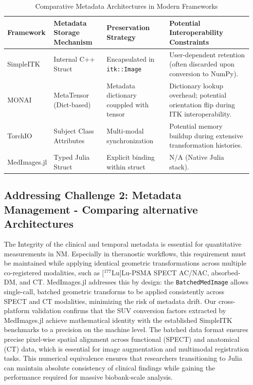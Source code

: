\documentclass[a4paper,10pt,preprint]{elsarticle}
\begin{document}
\begin{table}[H]
\centering
\caption{Comparative Metadata Architectures in Modern Frameworks}
\begin{tabular}{|p{2cm}|p{2.8cm}|p{2.8cm}|p{2.8cm}|}
\hline
\textbf{Framework} & \textbf{Metadata Storage Mechanism} & \textbf{Preservation Strategy} & \textbf{Potential Interoperability Constraints} \\
\hline
SimpleITK & Internal C++ Struct & Encapsulated in \texttt{itk::Image} & User-dependent retention (often discarded upon conversion to NumPy). \\
\hline
MONAI & MetaTensor (Dict-based) & Metadata dictionary couppled with tensor& Dictionary lookup overhead; potential orientation flip during ITK interoperability. \\
\hline
TorchIO & Subject Class Attributes & Multi-modal synchronization & Potential memory buildup during extensive transformation histories. \\
\hline
MedImages.jl & Typed Julia Struct & Explicit binding within struct & N/A (Native Julia stack). \\
\hline
\end{tabular}
\label{tab:metadata_comparison}
\end{table}


\subsection{Addressing Challenge 2: Metadata Management - Comparing alternative Architectures}
The Integrity of the clinical and temporal metadata is essential for quantitative measurements in NM. Especially in theranostic workflows, this requirement must be maintained while applying identical geometric transformations across multiple co-registered modalities, such as [$^{177}$Lu]Lu-PSMA SPECT AC/NAC, absorbed-DM, and CT.
MedImages.jl addresses this by design: the \texttt{BatchedMedImage} allows single-call, batched geometric transforms to be applied consistently across SPECT and CT modalities, minimizing the risk of metadata drift. Our cross-platform validation confirms that the SUV conversion factors extracted by MedImages.jl achieve mathematical identity with the established SimpleITK benchmarks to a precision on the machine level.
The batched data format ensures precise pixel-wise spatial alignment  across functional (SPECT) and anatomical (CT) data, which is essential for image augmentation and multimodal registration tasks.  
This numerical equivalence ensures that researchers transitioning to Julia can maintain absolute consistency of clinical findings while gaining the performance required for massive biobank-scale analysis.
\end{document}
